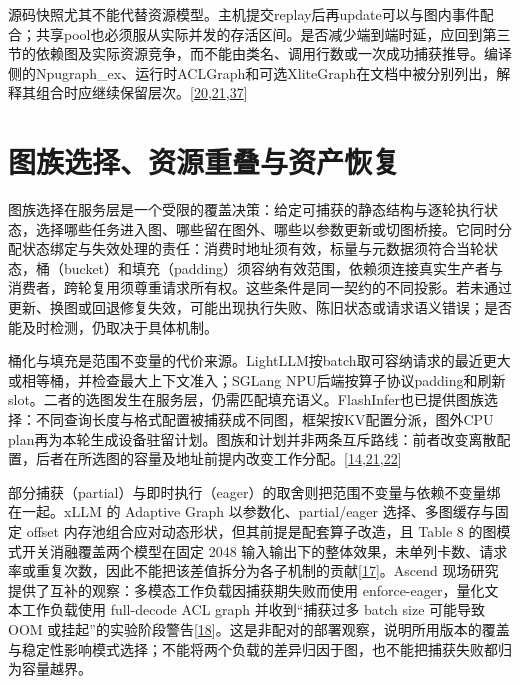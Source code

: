 \documentclass[
  UTF8,
  zihao=5]{ctexart}
\begin{document}
源码快照尤其不能代替资源模型。主机提交replay后再update可以与图内事件配合；共享pool也必须服从实际并发的存活区间。是否减少端到端时延，应回到第三节的依赖图及实际资源竞争，而不能由类名、调用行数或一次成功捕获推导。编译侧的Npugraph\_ex、运行时ACLGraph和可选XliteGraph在文档中被分别列出，解释其组合时应继续保留层次。{[}\protect\hyperlink{ref-vllmascend2026impl}{20},\protect\hyperlink{ref-sglang2026impl}{21},\protect\hyperlink{ref-vllmascendmode}{37}{]}

\hypertarget{ux56feux65cfux9009ux62e9ux8d44ux6e90ux91cdux53e0ux4e0eux8d44ux4ea7ux6062ux590d}{%
\section{图族选择、资源重叠与资产恢复}\label{ux56feux65cfux9009ux62e9ux8d44ux6e90ux91cdux53e0ux4e0eux8d44ux4ea7ux6062ux590d}}

图族选择在服务层是一个受限的覆盖决策：给定可捕获的静态结构与逐轮执行状态，选择哪些任务进入图、哪些留在图外、哪些以参数更新或切图桥接。它同时分配状态绑定与失效处理的责任：消费时地址须有效，标量与元数据须符合当轮状态，桶（bucket）和填充（padding）须容纳有效范围，依赖须连接真实生产者与消费者，跨轮复用须尊重请求所有权。这些条件是同一契约的不同投影。若未通过更新、换图或回退修复失效，可能出现执行失败、陈旧状态或请求语义错误；是否能及时检测，仍取决于具体机制。

桶化与填充是范围不变量的代价来源。LightLLM按batch取可容纳请求的最近更大或相等桶，并检查最大上下文准入；SGLang
NPU后端按算子协议padding和刷新slot。二者的选图发生在服务层，仍需匹配填充语义。FlashInfer也已提供图族选择：不同查询长度与格式配置被捕获成不同图，框架按KV配置分派，图外CPU
plan再为本轮生成设备驻留计划。图族和计划并非两条互斥路线：前者改变离散配置，后者在所选图的容量及地址前提内改变工作分配。{[}\protect\hyperlink{ref-ye2025flashinfer}{14},\protect\hyperlink{ref-sglang2026impl}{21},\protect\hyperlink{ref-lightllm2026code}{22}{]}

部分捕获（partial）与即时执行（eager）的取舍则把范围不变量与依赖不变量绑在一起。xLLM
的 Adaptive Graph 以参数化、partial/eager 选择、多图缓存与固定 offset
内存池组合应对动态形状，但其前提是配套算子改造，且 Table 8
的图模式开关消融覆盖两个模型在固定 2048
输入输出下的整体效果，未单列卡数、请求率或重复次数，因此不能把该差值拆分为各子机制的贡献{[}\protect\hyperlink{ref-liu2025xllm}{17}{]}。Ascend
现场研究提供了互补的观察：多模态工作负载因捕获期失败而使用
enforce-eager，量化文本工作负载使用 full-decode ACL graph
并收到``捕获过多 batch size 可能导致 OOM
或挂起''的实验阶段警告{[}\protect\hyperlink{ref-yu2026ascendfield}{18}{]}。这是非配对的部署观察，说明所用版本的覆盖与稳定性影响模式选择；不能将两个负载的差异归因于图，也不能把捕获失败都归为容量越界。
\end{document}
